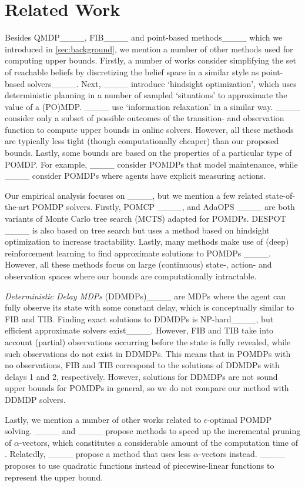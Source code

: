 \section{Related Work}
Besides QMDP____, FIB____ and point-based methods____ which we introduced in \cref{sec:background}, we mention a number of other methods used for computing upper bounds.
Firstly, a number of works consider simplifying the set of reachable beliefs by discretizing the belief space in a similar style as point-based solvers____.
Next, ____ introduce `hindsight optimization', which uses deterministic planning in a number of sampled `situations' to approximate the value of a (PO)MDP.
____ use `information relaxation' in a similar way.
____ consider only a subset of possible outcomes of the transition- and observation function to compute upper bounds in online solvers.
However, all these methods are typically less tight (though computationally cheaper) than our proposed bounds.
Lastly, some bounds are based on the properties of a particular type of POMDP.
For example, ____ consider POMDPs that model maintenance, while ____ consider POMDPs where agents have explicit measuring actions.

Our empirical analysis focuses on \SARSOP____, but we mention a few related state-of-the-art POMDP solvers.
Firstly, POMCP ____, and AdaOPS ____ are both variants of Monte Carlo tree search (MCTS) adapted for POMDPs.
DESPOT ____ is also based on tree search but uses a method based on hindsight optimization to increase tractability.
Lastly, many methods make use of (deep) reinforcement learning to find approximate solutions to POMDPs ____.
However, all these methods focus on large (continuous) state-, action- and observation spaces where our bounds are computationally intractable.

\emph{Deterministic Delay MDPs} (DDMDPs)____ are MDPs where the agent can fully observe its state with some constant delay, which is conceptually similar to FIB and TIB. 
Finding exact solutions to DDMDPs is NP-hard____, but efficient approximate solvers exist____.
However, FIB and TIB  take into account (partial) observations occurring before the state is fully revealed, while such observations do not exist in DDMDPs.
This means that in POMDPs with no observations, FIB and TIB correspond to the solutions of DDMDPs with delays 1 and 2, respectively.
However, solutions for DDMDPs are not sound upper bounds for POMDPs in general, so we do not compare our method with DDMDP solvers.

Lastly, we mention a number of other works related to $\epsilon$-optimal POMDP solving.
____ and ____ propose methods to speed up the incremental pruning of $\alpha$-vectors, which constitutes a considerable amount of the computation time of \SARSOP. 
Relatedly, ____ propose a method that uses less $\alpha$-vectors instead.
____ proposes to use quadratic functions instead of piecewise-linear functions to represent the upper bound.